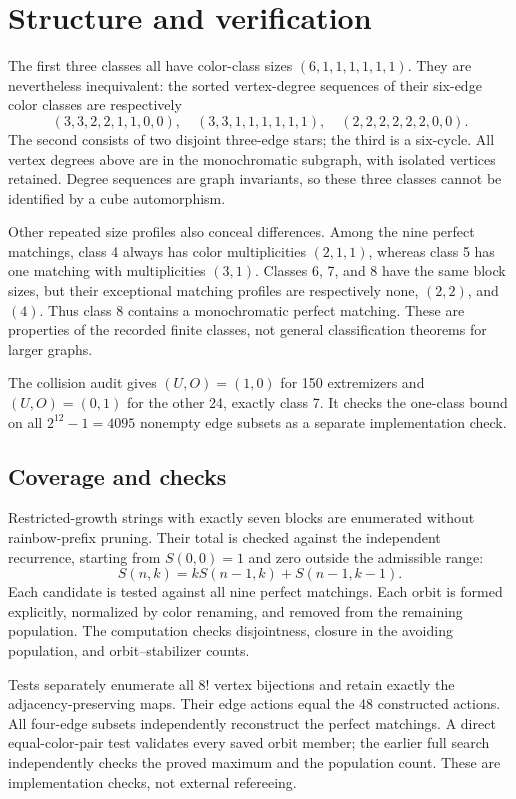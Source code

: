 \documentclass[11pt,letterpaper]{article}
\begin{document}
\newpage
\section{Structure and verification}
The first three classes all have color-class sizes $(6,1,1,1,1,1,1)$.
They are nevertheless inequivalent: the sorted vertex-degree sequences of
their six-edge color classes are respectively
\[
 (3,3,2,2,1,1,0,0),\quad
 (3,3,1,1,1,1,1,1),\quad
 (2,2,2,2,2,2,0,0).
\]
The second consists of two disjoint three-edge stars; the third is a
six-cycle. All vertex degrees above are in the monochromatic subgraph,
with isolated vertices retained. Degree sequences are graph invariants, so
these three classes cannot be identified by a cube automorphism.

Other repeated size profiles also conceal differences. Among the nine perfect
matchings, class 4 always has color multiplicities $(2,1,1)$, whereas class 5
has one matching with multiplicities $(3,1)$. Classes 6, 7, and 8 have the
same block sizes, but their exceptional matching profiles are respectively
none, $(2,2)$, and $(4)$. Thus class 8 contains a monochromatic perfect
matching. These are properties of the recorded finite classes, not general
classification theorems for larger graphs.

The collision audit gives $(U,O)=(1,0)$ for 150 extremizers and $(U,O)=(0,1)$
for the other 24, exactly class 7. It checks the one-class bound on all
$2^{12}-1=4095$ nonempty edge subsets as a separate implementation check.

\subsection*{Coverage and checks}
Restricted-growth strings with exactly seven blocks are enumerated without
rainbow-prefix pruning. Their total is checked against the independent
recurrence, starting from $S(0,0)=1$ and zero outside the admissible range:
\[
 S(n,k)=kS(n-1,k)+S(n-1,k-1).
\]
Each candidate is tested against all
nine perfect matchings. Each orbit is formed explicitly, normalized by color
renaming, and removed from the remaining population. The computation checks
disjointness, closure in the avoiding population, and orbit--stabilizer counts.

Tests separately enumerate all $8!$ vertex bijections and retain exactly
the adjacency-preserving maps. Their edge actions equal the 48 constructed
actions. All four-edge subsets independently reconstruct the perfect
matchings. A direct equal-color-pair test validates every saved orbit member;
the earlier full search independently checks the proved maximum and the
population count. These are implementation checks, not external refereeing.
\end{document}

